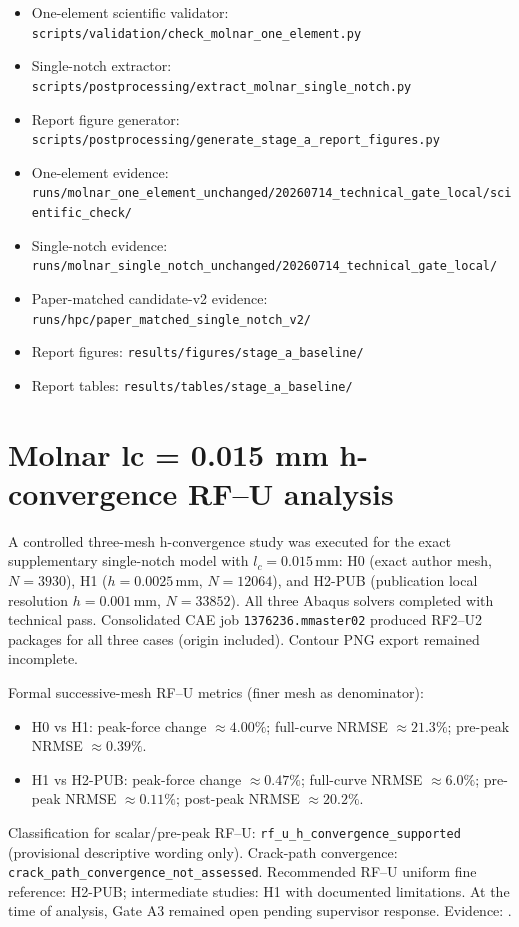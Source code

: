 \documentclass[11pt,a4paper]{article}
\begin{document}
\begin{itemize}
  \item One-element scientific validator: \texttt{scripts/validation/check\_molnar\_one\_element.py}
  \item Single-notch extractor: \texttt{scripts/postprocessing/extract\_molnar\_single\_notch.py}
  \item Report figure generator: \texttt{scripts/postprocessing/generate\_stage\_a\_report\_figures.py}
  \item One-element evidence: \texttt{runs/molnar\_one\_element\_unchanged/20260714\_technical\_gate\_local/scientific\_check/}
  \item Single-notch evidence: \texttt{runs/molnar\_single\_notch\_unchanged/20260714\_technical\_gate\_local/}
  \item Paper-matched candidate-v2 evidence: \texttt{runs/hpc/paper\_matched\_single\_notch\_v2/}
  \item Report figures: \texttt{results/figures/stage\_a\_baseline/}
  \item Report tables: \texttt{results/tables/stage\_a\_baseline/}
\end{itemize}


\section{Molnar lc = 0.015 mm h-convergence RF--U analysis}
\label{sec:molnar-lc015-hconv}

A controlled three-mesh h-convergence study was executed for the exact supplementary single-notch model with \(l_c = 0.015\,\mathrm{mm}\):
H0 (exact author mesh, \(N=3930\)), H1 (\(h=0.0025\,\mathrm{mm}\), \(N=12064\)), and H2-PUB (publication local resolution \(h=0.001\,\mathrm{mm}\), \(N=33852\)).
All three Abaqus solvers completed with technical pass.
Consolidated CAE job \texttt{1376236.mmaster02} produced RF2--U2 packages for all three cases (origin included). Contour PNG export remained incomplete.

Formal successive-mesh RF--U metrics (finer mesh as denominator):
\begin{itemize}
  \item H0 vs H1: peak-force change \(\approx 4.00\%\); full-curve NRMSE \(\approx 21.3\%\); pre-peak NRMSE \(\approx 0.39\%\).
  \item H1 vs H2-PUB: peak-force change \(\approx 0.47\%\); full-curve NRMSE \(\approx 6.0\%\); pre-peak NRMSE \(\approx 0.11\%\); post-peak NRMSE \(\approx 20.2\%\).
\end{itemize}
Classification for scalar/pre-peak RF--U: \texttt{rf\_u\_h\_convergence\_supported} (provisional descriptive wording only).
Crack-path convergence: \texttt{crack\_path\_convergence\_not\_assessed}.
Recommended RF--U uniform fine reference: H2-PUB; intermediate studies: H1 with documented limitations.
At the time of analysis, Gate A3 remained open pending supervisor response.
Evidence: .
\end{document}

